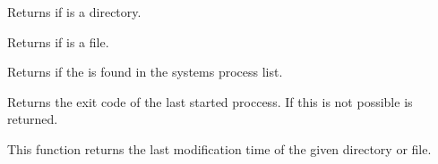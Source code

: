 \documentclass[letterpaper,10pt,english]{sphinxmanual}
\begin{document}
\begin{fulllineitems}
\begin{fulllineitems}
\end{fulllineitems}


\begin{fulllineitems}
\label{api/shell_terminals:batchq.pipelines.shell.bash.BashTerminal.isdir}
Returns  if  is a directory.

\end{fulllineitems}


\begin{fulllineitems}
\label{api/shell_terminals:batchq.pipelines.shell.bash.BashTerminal.isfile}
Returns  if  is a file.

\end{fulllineitems}


\begin{fulllineitems}
\label{api/shell_terminals:batchq.pipelines.shell.bash.BashTerminal.isrunning}
Returns  if the  is found in the systems process list.

\end{fulllineitems}


\begin{fulllineitems}
\label{api/shell_terminals:batchq.pipelines.shell.bash.BashTerminal.last_exitcode}
Returns the exit code of the last started proccess. If this is
not possible  is returned.

\end{fulllineitems}


\begin{fulllineitems}
\label{api/shell_terminals:batchq.pipelines.shell.bash.BashTerminal.last_modified}
This function returns the last modification time of the given
directory or file.


\end{fulllineitems}
\end{fulllineitems}
\end{document}
